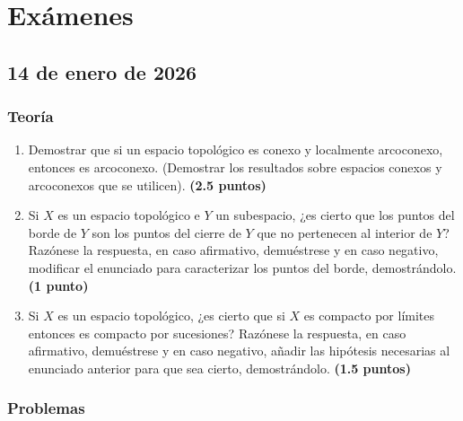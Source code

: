 \chapter{Ex\'amenes} 

\section{14 de enero de 2026}

\subsection{Teoría}

\begin{enumerate}
    \item Demostrar que si un espacio topológico es conexo y localmente arcoconexo, entonces es arcoconexo. (Demostrar los resultados sobre espacios conexos y arcoconexos que se utilicen).
    \hfill \textbf{(2.5 puntos)}

    \item Si $X$ es un espacio topológico e $Y$ un subespacio, ¿es cierto que los puntos del borde de $Y$ son los puntos del cierre de $Y$ que no pertenecen al interior de $Y$? Razónese la respuesta, en caso afirmativo, demuéstrese y en caso negativo, modificar el enunciado para caracterizar los puntos del borde, demostrándolo.
    \hfill \textbf{(1 punto)}

    \item Si $X$ es un espacio topológico, ¿es cierto que si $X$ es compacto por límites entonces es compacto por sucesiones? Razónese la respuesta, en caso afirmativo, demuéstrese y en caso negativo, añadir las hipótesis necesarias al enunciado anterior para que sea cierto, demostrándolo.
    \hfill \textbf{(1.5 puntos)}
\end{enumerate}

\subsection{Problemas}

